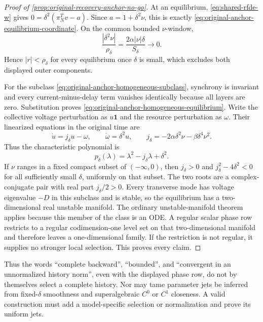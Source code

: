 \begin{proof}[Proof of \cref{prop:original-recovery-anchor-no-go}]
At an equilibrium, \cref{eq:shared-rfde-w} gives
\(0=\delta^2(\pi_N^Tv-a)\).  Since
\(a=1+\delta^2\nu\), this is exactly
\cref{eq:original-anchor-equilibrium-coordinate}.  On the common bounded
\(\nu\)-window,
\[
 \frac{|\delta^2\nu|}{\rho_\delta}
 =\frac{2\alpha|\nu|\delta}{S_\delta}\longrightarrow0.
\]
Hence \(|r|<\rho_\delta\) for every equilibrium once \(\delta\) is small,
which excludes both displayed outer components.

For the subclass \cref{eq:original-anchor-homogeneous-subclass}, synchrony
is invariant and every current-minus-delay term vanishes identically because
all layers are zero.  Substitution proves
\cref{eq:original-anchor-homogeneous-equilibrium}.  Write the collective
voltage perturbation as \(u\mathbf1\) and the resource perturbation as
\(\omega\).  Their linearized equations in the original time are
\begin{equation}
 \dot u=j_\delta u-\omega,
 \qquad
 \dot\omega=\delta^2u,
 \qquad
 j_\delta=-2\alpha\delta^2\nu-\beta\delta^4\nu^2.  \label{eq:original-anchor-collective-linearization}
\end{equation}
Thus the characteristic polynomial is
\begin{equation}
 p_\delta(\lambda)=\lambda^2-j_\delta\lambda+\delta^2.
                                                               \label{eq:original-anchor-characteristic-polynomial}
\end{equation}
If \(\nu\) ranges in a fixed compact subset of \(( -\infty,0)\), then
\(j_\delta>0\) and
\(j_\delta^2-4\delta^2<0\) for all sufficiently small \(\delta\), uniformly
on that subset.  The two roots are a complex-conjugate pair with real part
\(j_\delta/2>0\).  Every transverse mode has voltage eigenvalue \(-D\) in
this subclass and is stable, so the equilibrium has a two-dimensional real
unstable manifold.  The ordinary unstable-manifold theorem applies because
this member of the class is an ODE.  A regular scalar phase row restricts to
a regular codimension-one level set on that two-dimensional manifold and
therefore leaves a one-dimensional family.  If the restriction is not
regular, it supplies no stronger local selection.  This proves every claim.
\end{proof}

Thus the words ``complete backward'', ``bounded'', and ``convergent in an
unnormalized history norm'', even with the displayed phase row, do not by
themselves select a complete history.  Nor may tame parameter jets be
inferred from fixed-\(\delta\) smoothness and superalgebraic \(C^0\) or
\(C^1\) closeness.  A valid construction must add a model-specific selection
or normalization and prove its uniform jets.
